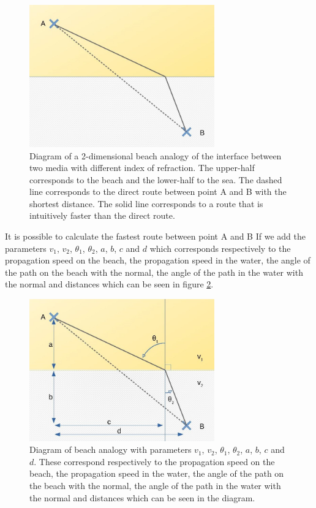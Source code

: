 \documentclass{article}
\begin{document}
\begin{figure}[h!]
	\centering
	\includegraphics[width=8cm]{afbeeldingen/snell_diagram_leeg.jpg}
	\caption{Diagram of a 2-dimensional beach analogy of the interface between two media with different index of refraction. The upper-half corresponds to the beach and the lower-half to the sea. The dashed line corresponds to the direct route between point A and B with the shortest distance. The solid line corresponds to a route that is intuitively faster than the direct route.}
	\label{fig_snell_empty}
\end{figure}

It is possible to calculate the fastest route between point A and B If we add the parameters $v_1$, $v_2$, $\theta _1$, $\theta _2$, $a$, $b$, $c$ and $d$ which corresponds respectively to the propagation speed on the beach, the propagation speed in the water, the angle of the path on the beach with the normal, the angle of the path in the water with the normal and distances which can be seen in figure \ref{fig_snell_full}.

\begin{figure}[h!]
	\centering
	\includegraphics[width=8cm]{afbeeldingen/snell_diagram_vol.jpg}
	\caption{Diagram of beach analogy with parameters $v_1$, $v_2$, $\theta _1$, $\theta _2$, $a$, $b$, $c$ and $d$. These correspond respectively to the propagation speed on the beach, the propagation speed in the water, the angle of the path on the beach with the normal, the angle of the path in the water with the normal and distances which can be seen in the diagram.}
	\label{fig_snell_full}
\end{figure}
\end{document}
